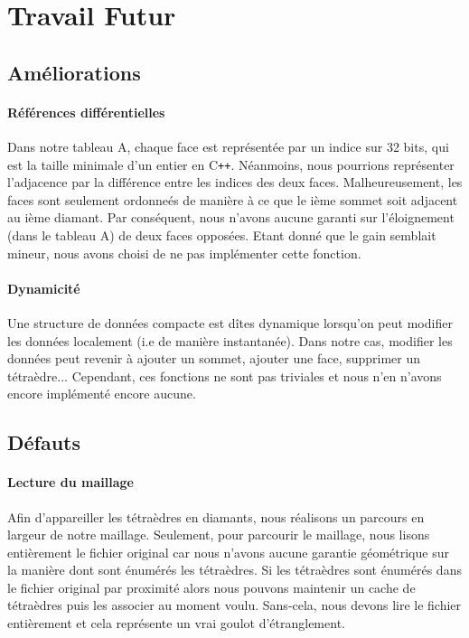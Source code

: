\section{Travail Futur}
\subsection{Améliorations}
\paragraph{Références différentielles}
Dans notre tableau A, chaque face est représentée par un indice sur 32 bits, qui est la taille minimale d'un entier en C\texttt{++}. Néanmoins, nous pourrions représenter l'adjacence par la différence entre les indices des deux faces. Malheureusement, les faces sont seulement ordonneés de manière à ce que le ième sommet soit adjacent au ième diamant. Par conséquent, nous n'avons aucune garanti sur l'éloignement (dans le tableau A) de deux faces opposées. Etant donné que le gain semblait mineur, nous avons choisi de ne pas implémenter cette fonction.
\paragraph{Dynamicité}
Une structure de données compacte est dîtes dynamique lorsqu'on peut modifier les données localement (i.e de manière instantanée). Dans notre cas, modifier les données peut revenir à ajouter un sommet, ajouter une face, supprimer un tétraèdre... Cependant, ces fonctions ne sont pas triviales et nous n'en n'avons encore implémenté encore aucune.

\subsection{Défauts}
\noindent
\paragraph{Lecture du maillage}Afin d'appareiller les tétraèdres en diamants, nous réalisons un parcours en largeur de notre maillage. Seulement, pour parcourir le maillage, nous lisons entièrement le fichier original car nous n'avons aucune garantie géométrique sur la manière dont sont énumérés les tétraèdres. Si les tétraèdres sont énumérés dans le fichier original par proximité alors nous pouvons maintenir un cache de tétraèdres puis les associer au moment voulu. Sans-cela, nous devons lire le fichier entièrement et cela représente un vrai goulot d'étranglement.
